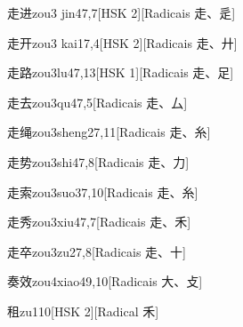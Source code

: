 \begin{entry}{走进}{zou3 jin4}{7,7}[HSK 2][Radicais ⾛、⾡]
\end{entry}

\begin{entry}{走开}{zou3 kai1}{7,4}[HSK 2][Radicais ⾛、⼶]
\end{entry}

\begin{entry}{走路}{zou3lu4}{7,13}[HSK 1][Radicais ⾛、⾜]
\end{entry}

\begin{entry}{走去}{zou3qu4}{7,5}[Radicais ⾛、⼛]
\end{entry}

\begin{entry}{走绳}{zou3sheng2}{7,11}[Radicais ⾛、⽷]
\end{entry}

\begin{entry}{走势}{zou3shi4}{7,8}[Radicais ⾛、⼒]
\end{entry}

\begin{entry}{走索}{zou3suo3}{7,10}[Radicais ⾛、⽷]
\end{entry}

\begin{entry}{走秀}{zou3xiu4}{7,7}[Radicais ⾛、⽲]
\end{entry}

\begin{entry}{走卒}{zou3zu2}{7,8}[Radicais ⾛、⼗]
\end{entry}

\begin{entry}{奏效}{zou4xiao4}{9,10}[Radicais ⼤、⽁]
\end{entry}

\begin{entry}{租}{zu1}{10}[HSK 2][Radical ⽲]
\end{entry}

